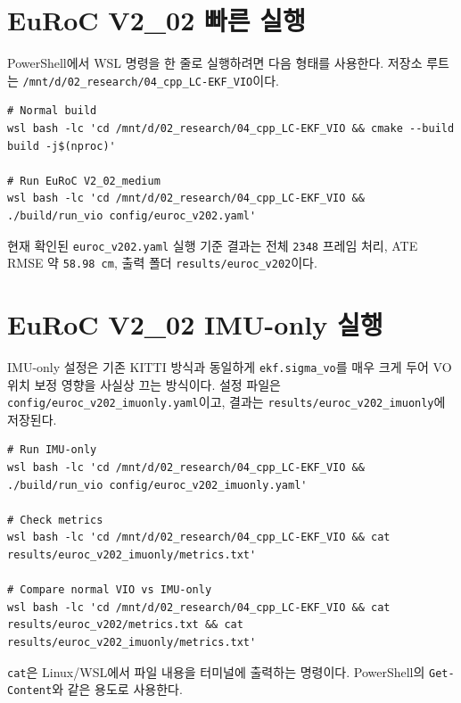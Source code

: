 \documentclass[11pt,a4paper,oneside]{report}
\begin{document}
\section{EuRoC V2\_02 빠른 실행}

PowerShell에서 WSL 명령을 한 줄로 실행하려면 다음 형태를 사용한다. 저장소 루트는
\texttt{/mnt/d/02\_research/04\_cpp\_LC-EKF\_VIO}이다.

\begin{lstlisting}[style=shell,caption={일반 빌드와 EuRoC V2\_02 실행}]
# Normal build
wsl bash -lc 'cd /mnt/d/02_research/04_cpp_LC-EKF_VIO && cmake --build build -j$(nproc)'

# Run EuRoC V2_02_medium
wsl bash -lc 'cd /mnt/d/02_research/04_cpp_LC-EKF_VIO && ./build/run_vio config/euroc_v202.yaml'
\end{lstlisting}

\begin{infobox}
현재 확인된 \texttt{euroc\_v202.yaml} 실행 기준 결과는 전체 \texttt{2348} 프레임 처리,
ATE RMSE 약 \texttt{58.98 cm}, 출력 폴더 \texttt{results/euroc\_v202}이다.
\end{infobox}

\section{EuRoC V2\_02 IMU-only 실행}

IMU-only 설정은 기존 KITTI 방식과 동일하게 \texttt{ekf.sigma\_vo}를 매우 크게 두어
VO 위치 보정 영향을 사실상 끄는 방식이다. 설정 파일은
\texttt{config/euroc\_v202\_imuonly.yaml}이고, 결과는
\texttt{results/euroc\_v202\_imuonly}에 저장된다.

\begin{lstlisting}[style=shell,caption={IMU-only 실행과 결과 확인}]
# Run IMU-only
wsl bash -lc 'cd /mnt/d/02_research/04_cpp_LC-EKF_VIO && ./build/run_vio config/euroc_v202_imuonly.yaml'

# Check metrics
wsl bash -lc 'cd /mnt/d/02_research/04_cpp_LC-EKF_VIO && cat results/euroc_v202_imuonly/metrics.txt'

# Compare normal VIO vs IMU-only
wsl bash -lc 'cd /mnt/d/02_research/04_cpp_LC-EKF_VIO && cat results/euroc_v202/metrics.txt && cat results/euroc_v202_imuonly/metrics.txt'
\end{lstlisting}

\begin{infobox}
\texttt{cat}은 Linux/WSL에서 파일 내용을 터미널에 출력하는 명령이다.
PowerShell의 \texttt{Get-Content}와 같은 용도로 사용한다.
\end{infobox}
\end{document}
